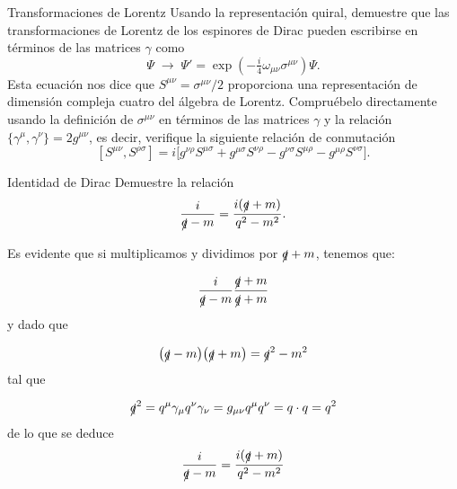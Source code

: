 
\begin{Ejercicio}{Transformaciones de Lorentz}
	Usando la representación quiral, demuestre que las transformaciones de Lorentz de los espinores de Dirac pueden escribirse en términos de las matrices $\gamma$ como
	\[
		\Psi \;\longrightarrow\; \Psi' = \exp\!\left(-\tfrac{i}{4}\omega_{\mu\nu}\sigma^{\mu\nu}\right)\Psi.
	\]
	Esta ecuación nos dice que $S^{\mu\nu} = \sigma^{\mu\nu}/2$ proporciona una representación de dimensión compleja cuatro del álgebra de Lorentz.
	Compruébelo directamente usando la definición de $\sigma^{\mu\nu}$ en términos de las matrices $\gamma$ y la relación $\{\gamma^\mu,\gamma^\nu\}=2g^{\mu\nu}$, es decir, verifique la siguiente relación de conmutación
	\[
		[S^{\mu\nu},S^{\rho\sigma}] = i\Big[g^{\nu\rho}S^{\mu\sigma} + g^{\mu\sigma}S^{\nu\rho} - g^{\nu\sigma}S^{\mu\rho} - g^{\mu\rho}S^{\nu\sigma}\Big].
	\]
\end{Ejercicio}





\begin{Ejercicio}{Identidad de Dirac}
	Demuestre la relación
	\[
		\frac{i}{\slashed{q}-m} = \frac{i(\slashed{q}+m)}{q^2-m^2}.
	\]
\end{Ejercicio}

Es evidente que si multiplicamos y dividimos por $\slashed{q}+m$, tenemos que:  

\begin{equation}
	\frac{i}{\slashed{q}-m} \frac{\slashed{q}+m}{\slashed{q}+m} 
\end{equation}
y dado que 

\begin{equation}
	\pqty{{\slashed{q}-m}}\pqty{{\slashed{q}+m}} = \qslash^2 - m^2 
\end{equation}
tal que 

\begin{equation}
	\slashed{q}^2 = q^\mu \gamma_\mu q^\nu \gamma_\nu = g_{\mu \nu} q^\mu q^\nu = q \cdot q = q^2
\end{equation}
de lo que se deduce 
\begin{equation}
	\frac{i}{\slashed{q}-m} = \frac{i(\slashed{q}+m)}{q^2-m^2}
\end{equation}

